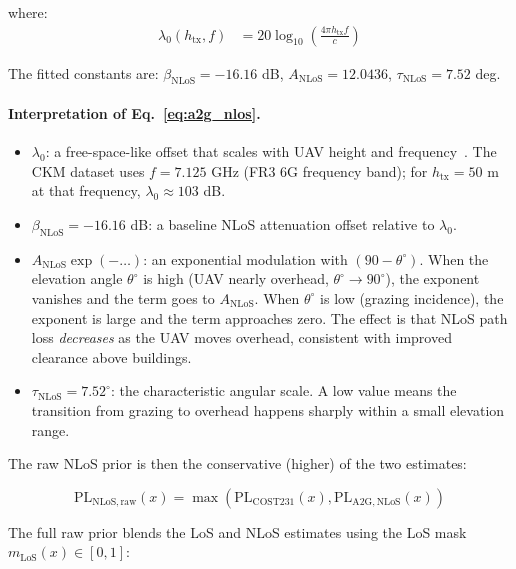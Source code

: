 \documentclass[11pt,a4paper]{article}
\begin{document}
where:
\begin{align}
\lambda_0(h_{\mathrm{tx}}, f)
&= 20\log_{10}\!\left(\frac{4\pi h_{\mathrm{tx}} f}{c}\right)
\label{eq:lambda0}
\end{align}

The fitted constants are:
$\beta_{\mathrm{NLoS}} = -16.16$ dB,
$A_{\mathrm{NLoS}} = 12.0436$,
$\tau_{\mathrm{NLoS}} = 7.52$ deg.

\paragraph{Interpretation of Eq.~\eqref{eq:a2g_nlos}.}
\begin{itemize}
\item $\lambda_0$: a free-space-like offset that scales with UAV height and
      frequency~\cite{khawaja_survey,wocc2021}. The CKM dataset uses
      $f = 7.125$ GHz (FR3 6G frequency band); for
      $h_{\mathrm{tx}} = 50$ m at that frequency, $\lambda_0 \approx 103$ dB.
\item $\beta_{\mathrm{NLoS}} = -16.16$ dB: a baseline NLoS attenuation
      offset relative to $\lambda_0$.
\item $A_{\mathrm{NLoS}}\exp(-\ldots)$: an exponential modulation with
      $(90 - \theta^\circ)$. When the elevation angle $\theta^\circ$ is high
      (UAV nearly overhead, $\theta^\circ \to 90^\circ$), the exponent
      vanishes and the term goes to $A_{\mathrm{NLoS}}$. When $\theta^\circ$
      is low (grazing incidence), the exponent is large and the term
      approaches zero. The effect is that NLoS path loss \emph{decreases} as
      the UAV moves overhead, consistent with improved clearance above
      buildings.
\item $\tau_{\mathrm{NLoS}} = 7.52^\circ$: the characteristic angular scale.
      A low value means the transition from grazing to overhead happens
      sharply within a small elevation range.
\end{itemize}

The raw NLoS prior is then the conservative (higher) of the two estimates:

\begin{equation}
\mathrm{PL}_{\mathrm{NLoS,raw}}(x)
=
\max\left(
\mathrm{PL}_{\mathrm{COST231}}(x),
\mathrm{PL}_{\mathrm{A2G,NLoS}}(x)
\right)
\label{eq:nlos_raw}
\end{equation}

The full raw prior blends the LoS and NLoS estimates using the LoS mask
$m_{\mathrm{LoS}}(x) \in [0,1]$:
\end{document}
